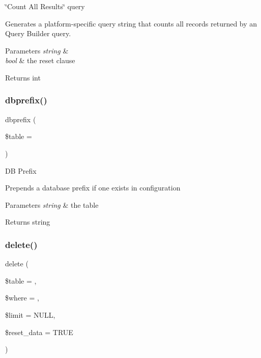 \char`\"{}\+Count All Results\char`\"{} query

Generates a platform-\/specific query string that counts all records returned by an Query Builder query.


\begin{DoxyParams}{Parameters}
{\em string} & \\
\hline
{\em bool} & the reset clause \\
\hline
\end{DoxyParams}
\begin{DoxyReturn}{Returns}
int 
\end{DoxyReturn}
\mbox{\label{class_c_i___d_b__query__builder_a98b692562f4990d04d161d0408061ed8}} 
\subsubsection{\texorpdfstring{dbprefix()}{dbprefix()}}
{\footnotesize\ttfamily dbprefix (\begin{DoxyParamCaption}\item[{}]{\$table = {\ttfamily \textquotesingle{}\textquotesingle{}} }\end{DoxyParamCaption})}

DB Prefix

Prepends a database prefix if one exists in configuration


\begin{DoxyParams}{Parameters}
{\em string} & the table \\
\hline
\end{DoxyParams}
\begin{DoxyReturn}{Returns}
string 
\end{DoxyReturn}
\mbox{\label{class_c_i___d_b__query__builder_a482722b9989c53ed8ecd68b22df64507}} 
\subsubsection{\texorpdfstring{delete()}{delete()}}
{\footnotesize\ttfamily delete (\begin{DoxyParamCaption}\item[{}]{\$table = {\ttfamily \textquotesingle{}\textquotesingle{}},  }\item[{}]{\$where = {\ttfamily \textquotesingle{}\textquotesingle{}},  }\item[{}]{\$limit = {\ttfamily NULL},  }\item[{}]{\$reset\+\_\+data = {\ttfamily TRUE} }\end{DoxyParamCaption})}

